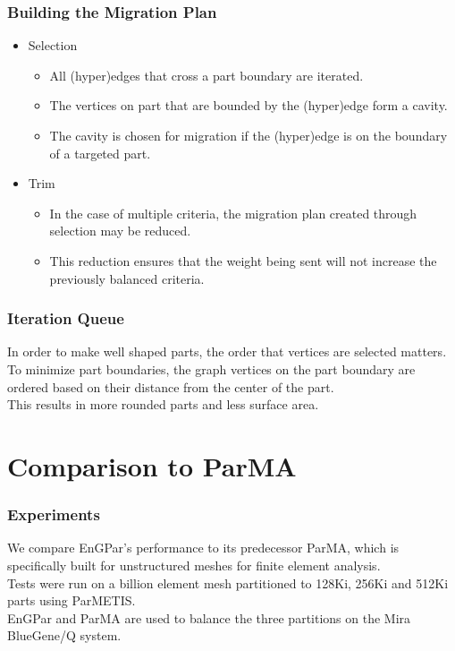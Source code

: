 \documentclass{beamer}
\begin{document}
\begin{frame}
  \frametitle{Building the Migration Plan}
  \begin{itemize}
  \item Selection
    \begin{itemize}
    \item All (hyper)edges that cross a part boundary are iterated.
    \item The vertices on part that are bounded by the (hyper)edge form a cavity.
    \item The cavity is chosen for migration if the (hyper)edge is on the boundary of a targeted part.
    \end{itemize}
  \item Trim %
    \begin{itemize}
    \item In the case of multiple criteria, the migration plan created through selection may be reduced.
    \item This reduction ensures that the weight being sent will not increase the previously balanced criteria.
    \end{itemize}
  \end{itemize}
\end{frame}


\begin{frame}
  \frametitle{Iteration Queue}
  In order to make well shaped parts, the order that vertices are selected matters. \\
  \bigskip
  To minimize part boundaries, the graph vertices on the part boundary are ordered based on their distance from the center of the part. \\
  \bigskip
  This results in more rounded parts and less surface area. 
\end{frame}


\section{Comparison to ParMA}

\begin{frame}
  \frametitle{Experiments}
  We compare EnGPar's performance to its predecessor ParMA, which is specifically built for unstructured meshes for finite element analysis.\\
  \medskip
  Tests were run on a billion element mesh partitioned to 128Ki, 256Ki and 512Ki parts using ParMETIS. \\
  \medskip
  EnGPar and ParMA are used to balance the three partitions on the Mira BlueGene/Q system.
\end{frame}
\end{document}
